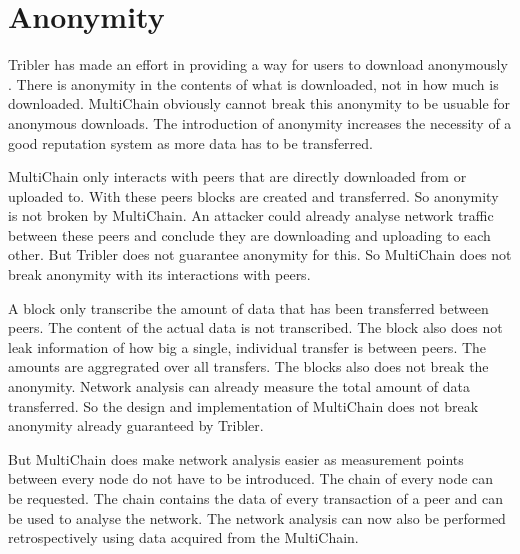 \section{Anonymity}
Tribler has made an effort in providing a way for users to download anonymously
\cite{Plak-anonymous}\cite{ruigrok-anonymous}.
There is anonymity in the contents of what is downloaded, not in how much is downloaded.
MultiChain obviously cannot break this anonymity to be usuable for anonymous downloads.
The introduction of anonymity increases the necessity of a good reputation system as more data has to be transferred.

MultiChain only interacts with peers that are directly downloaded from or uploaded to.
With these peers blocks are created and transferred.
So anonymity is not broken by MultiChain.
An attacker could already analyse network traffic between these peers
and conclude they are downloading and uploading to each other.
But Tribler does not guarantee anonymity for this.
So MultiChain does not break anonymity with its interactions with peers.

A block only transcribe the amount of data that has been transferred between peers.
The content of the actual data is not transcribed.
The block also does not leak information of how big a single, individual transfer is between peers.
The amounts are aggregrated over all transfers.
The blocks also does not break the anonymity.
Network analysis can already measure the total amount of data transferred.
So the design and implementation of MultiChain does not break anonymity already guaranteed by Tribler.

But MultiChain does make network analysis easier as measurement points between every node do not have to be introduced.
The chain of every node can be requested.
The chain contains the data of every transaction of a peer and can be used to analyse the network.
The network analysis can now also be performed retrospectively using data acquired from the MultiChain.
